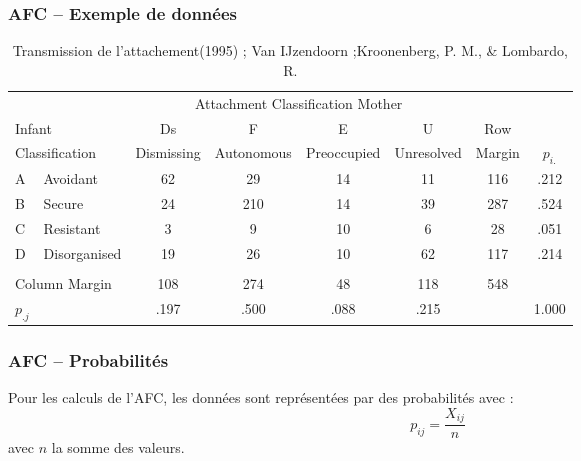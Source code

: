 \begin{frame}
  \frametitle{AFC --  Exemple de données}
  \begin{scriptsize}
    \begin{table}
      \begin{tabular}{llcccccc}
        \toprule
        &&\multicolumn{4}{c}{Attachment Classification Mother}\\
        \cline{3-7}
        \multicolumn{2}{l}{Infant} & Ds & F & E & U &Row&\\
        \multicolumn{2}{l}{Classification} & Dismissing & Autonomous & Preoccupied & Unresolved & Margin &$p_{i.}$\\
        \midrule
        A & Avoidant     & 62 &  29 & 14 & 11 & 116& .212\\
        B & Secure       & 24 & 210 & 14 & 39 & 287& .524\\
        C & Resistant    &  3 &   9 & 10 &  6 &  28& .051\\
        D & Disorganised & 19 &  26 & 10 & 62 & 117& .214\\
        &&&&&&&\\
        \multicolumn{2}{l}{Column Margin} & 108 & 274 & 48 & 118 & 548 &\\
        \midrule
        $p_{.j}$& & .197 & .500 & .088 & .215 & & 1.000\\
        \bottomrule
      \end{tabular}
      \caption{Transmission de l'attachement(1995) ; Van  IJzendoorn ;Kroonenberg, P. M., \& Lombardo, R. }
    \end{table}
  \end{scriptsize}
\end{frame}

\begin{frame}
  \frametitle{AFC -- Probabilités}
  \begin{minipage}{0.45\linewidth}
  \end{minipage}
  \hfill
  \begin{minipage}{0.49\linewidth}
    Pour les calculs de l'AFC, les données sont représentées par des probabilités avec :
    \begin{equation*}
      p_{ij}=\frac{X_{ij}}{n} 
    \end{equation*}
    avec $n$ la somme des valeurs.
  \end{minipage}
\end{frame}

